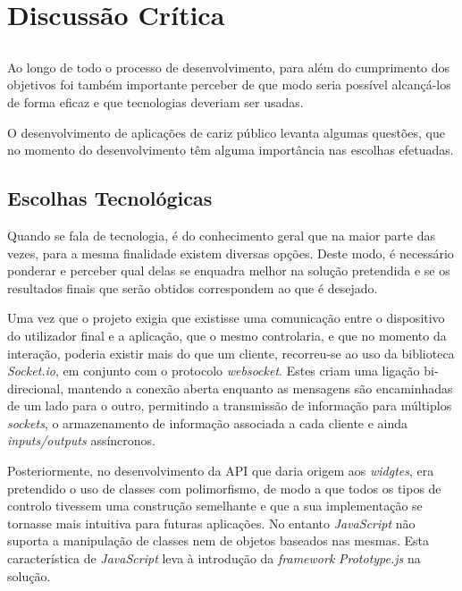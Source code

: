 \chapter{Discussão Crítica} \label{chap:disc}

\section*{}

Ao longo de todo o processo de desenvolvimento, para além do cumprimento dos objetivos foi também importante perceber de que modo seria possível alcançá-los de forma eficaz e que tecnologias deveriam ser usadas.

O desenvolvimento de aplicações de cariz público levanta algumas questões, que no momento do desenvolvimento têm alguma importância nas escolhas efetuadas.

\section{Escolhas Tecnológicas}

Quando se fala de tecnologia, é do conhecimento geral que na maior parte das vezes, para a mesma finalidade existem diversas opções. Deste modo, é necessário ponderar e perceber qual delas se enquadra melhor na solução pretendida e se os resultados finais que serão obtidos correspondem ao que é desejado.

Uma vez que o projeto exigia que existisse uma comunicação entre o dispositivo do utilizador final e a aplicação, que o mesmo controlaria, e que no momento da interação, poderia existir mais do que um cliente, recorreu-se ao uso da biblioteca \textit{Socket.io}, em conjunto com o protocolo \textit{websocket}. Estes criam uma ligação bi-direcional, mantendo a conexão aberta enquanto as mensagens são encaminhadas de um lado para o outro, permitindo a transmissão de informação para múltiplos \textit{sockets}, o armazenamento de informação associada a cada cliente e ainda \textit{inputs/outputs} assíncronos. 

Posteriormente, no desenvolvimento da API que daria origem aos \textit{widgtes}, era pretendido o uso de classes com polimorfismo, de modo a que todos os tipos de controlo tivessem uma construção semelhante e que a sua implementação se tornasse mais intuitiva para futuras aplicações. No entanto \textit{JavaScript} não suporta a manipulação de classes nem de objetos baseados nas mesmas. Esta característica de \textit{JavaScript} leva à introdução da \textit{framework} \textit{Prototype.js} na solução.

